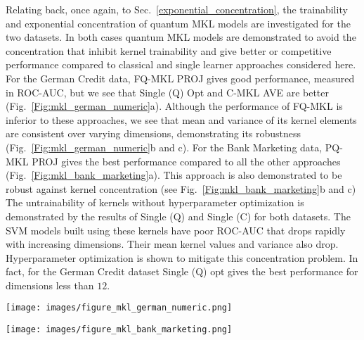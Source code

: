 \documentclass[reprint,amsfonts, amssymb, amsmath,  showkeys, nofootinbib,pra, superscriptaddress, twocolumn,longbibliography]{revtex4-2}
\begin{document}
Relating back, once again, to Sec.~\ref{exponential_concentration}, the trainability and exponential concentration of quantum MKL models are investigated for the two datasets.
In both cases quantum MKL models are demonstrated to avoid the concentration that inhibit kernel trainability and give better or competitive performance compared to classical and single learner approaches considered here.
For the German Credit data, FQ-MKL PROJ gives good performance, measured in ROC-AUC, but we see that Single (Q) Opt and C-MKL AVE are better (Fig.~\ref{Fig:mkl_german_numeric}a). Although the performance of FQ-MKL is inferior to these approaches, we see that mean and variance of its kernel elements are consistent over varying dimensions, demonstrating its robustness (Fig.~\ref{Fig:mkl_german_numeric}b and c).
For the Bank Marketing data, PQ-MKL PROJ gives the best performance compared to all the other approaches (Fig.~\ref{Fig:mkl_bank_marketing}a).  
This approach is also demonstrated to be robust against kernel concentration (see Fig.~\ref{Fig:mkl_bank_marketing}b and c)
The untrainability of kernels without hyperparameter optimization is demonstrated by the results of Single (Q) and Single (C) for both datasets. The SVM models built using these kernels have poor ROC-AUC that drops rapidly with increasing dimensions. Their mean kernel values and variance also drop.
Hyperparameter optimization is shown to mitigate this concentration problem. In fact, for the German Credit dataset Single (Q) opt gives the best performance for dimensions less than $12$.

\begin{figure*}
\centering
    \texttt{[image: images/figure\_mkl\_german\_numeric.png]}
    \caption{\label{Fig:mkl_german_numeric} 
    (a) ROC-AUC of a quantum model, FQ-MKL PROJ, is compared with a classical model (C-MKL AVE) and representative single learner models for the German Credit data. The description of single learners are equivalent to Fig.~\ref{Fig:mkl_real_data}. (b) Variance and (c) mean of kernel matrix used to build the SVM models in (a) are plotted.
    }
\end{figure*}

\begin{figure*}
\centering
    \texttt{[image: images/figure\_mkl\_bank\_marketing.png]}
    \caption{\label{Fig:mkl_bank_marketing} 
    (a) ROC-AUC of a quantum model, PQ-MKL PROJ, is compared with a classical model (C-MKL SDP) and representative single learner models for the Bank Marketing data. The description of single learners are equivalent to Fig.~\ref{Fig:mkl_real_data}. (b) Variance and (c) mean of kernel matrix used to build the SVM models in (a) are plotted.
    }
\end{figure*}
\end{document}
